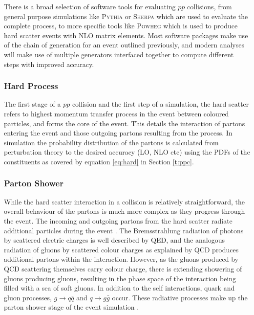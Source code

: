 	There is a broad selection of software tools for evaluating $pp$ collisions, from general purpose simulations like \textsc{Pythia}\cite{pythia} or \textsc{Sherpa}\cite{sherpa} which are used to evaluate the complete process, to more specific tools like \textsc{Powheg}\cite{powheg} which is used to produce hard scatter events with NLO matrix elements. Most software packages make use of the chain of generation for an event outlined previously, and modern analyses will make use of multiple generators interfaced together to compute different steps with improved accuracy.

		\subsubsection{Hard Process}

			The first stage of a $pp$ collision and the first step of a simulation, the hard scatter refers to highest momentum transfer process in the event between coloured particles, and forms the core of the event. This details the interaction of partons entering the event and those outgoing partons resulting from the process. In simulation the probability distribution of the partons is calculated from perturbation theory to the desired accuracy (LO, NLO etc) using the PDFs of the constituents as covered by equation \ref{eq:hard} in Section \ref{t:ppc}.

		\subsubsection{Parton Shower}

			While the hard scatter interaction in a collision is relatively straightforward, the overall behaviour of the partons is much more complex as they progress through the event. The incoming and outgoing partons from the hard scatter radiate additional  particles during the event \cite{martinshaw, monte-carlo}.
			The Bremsstrahlung  radiation of photons by scattered electric charges is well described by QED, and the analogous radiation of gluons by scattered colour charges as explained by QCD produces additional partons within the interaction. However, as the gluons produced by QCD scattering themselves carry colour charge, there is extending showering of gluons producing gluons, resulting in the phase space of the interaction being filled with a sea of soft gluons. In addition to the self interactions, quark and gluon processes, $g\rightarrow q\bar{q}$ and $q\rightarrow g\bar{g}$ occur. These radiative processes make up the parton shower stage of the event simulation \cite{monte-carlo}.

